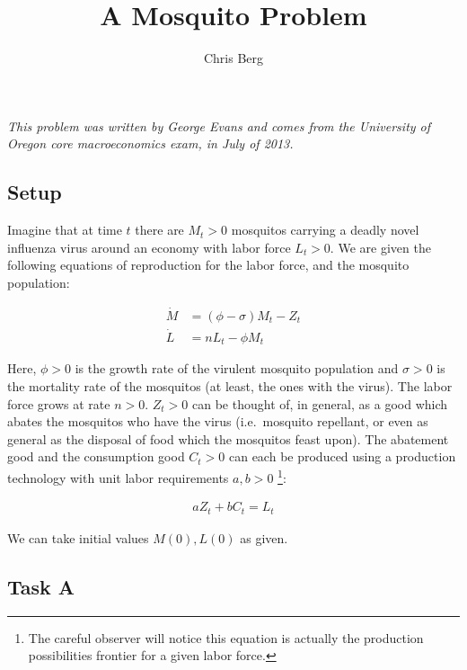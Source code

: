 \documentclass[
]{article}
\title{A Mosquito Problem}
\author{Chris Berg}
\date{}
\begin{document}
\maketitle

\emph{This problem was written by George Evans and comes from the
University of Oregon core macroeconomics exam, in July of 2013.}

\hypertarget{setup}{%
\subsection{Setup}\label{setup}}

Imagine that at time \(t\) there are \(M_t > 0\) mosquitos carrying a
deadly novel influenza virus around an economy with labor force
\(L_t > 0\). We are given the following equations of reproduction for
the labor force, and the mosquito population:

\begin{align}

\dot{M} &= (\phi - \sigma)M_t - Z_t \\
\dot{L} &= nL_t - \phi M_t

\end{align}

Here, \(\phi > 0\) is the growth rate of the virulent mosquito
population and \(\sigma > 0\) is the mortality rate of the mosquitos (at
least, the ones with the virus). The labor force grows at rate
\(n > 0\). \(Z_t > 0\) can be thought of, in general, as a good which
abates the mosquitos who have the virus (i.e.~mosquito repellant, or
even as general as the disposal of food which the mosquitos feast upon).
The abatement good and the consumption good \(C_t > 0\) can each be
produced using a production technology with unit labor requirements
\(a,b > 0\) \footnote{The careful observer will notice this equation is
  actually the production possibilities frontier for a given labor
  force.}:

\begin{align}

aZ_t + bC_t = L_t

\end{align}

We can take initial values \(M(0) , L(0)\) as given.

\hypertarget{task-a}{%
\subsection{Task A}\label{task-a}}
\end{document}
